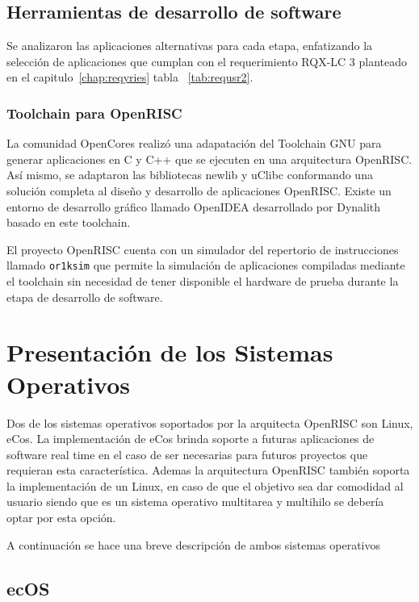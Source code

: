  				\subsection {Herramientas de desarrollo de software}
 			
				Se analizaron las aplicaciones alternativas para cada etapa, enfatizando la selección de aplicaciones que cumplan con el requerimiento RQX-LC 3
				planteado en el capitulo~\ref{chap:reqyries} tabla ~\ref{tab:requsr2}.   
				 			
 				\subsubsection {Toolchain para OpenRISC}
 				La comunidad OpenCores realizó una adapatación del Toolchain GNU para generar aplicaciones en C y C++ que se ejecuten en una arquitectura
 				OpenRISC. Así mismo, se adaptaron las bibliotecas newlib y uClibc conformando una solución completa al diseño y desarrollo de aplicaciones
 				OpenRISC. Existe un entorno de desarrollo gráfico llamado OpenIDEA desarrollado por Dynalith basado en este toolchain. 
				
				El proyecto OpenRISC cuenta con un simulador del repertorio de instrucciones llamado \verb|or1ksim| que permite la simulación de aplicaciones compiladas
				mediante el toolchain sin necesidad de tener disponible el hardware de prueba durante la etapa de desarrollo de software.
 				
 	

		\section{Presentación de los Sistemas Operativos}
 
Dos de los sistemas operativos soportados por la arquitecta OpenRISC son Linux, eCos. La implementación de eCos brinda soporte a futuras aplicaciones de software real time en el caso de ser necesarias para futuros proyectos que requieran esta característica. Ademas la arquitectura OpenRISC también soporta la implementación de un Linux, en caso de que el objetivo sea dar comodidad al usuario siendo que es un sistema operativo multitarea y multihilo se debería optar por esta opción.

A continuación se hace una breve descripción de ambos sistemas operativos
		
			 	\subsection{ecOS}


